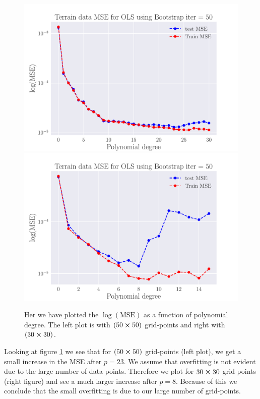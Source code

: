 \documentclass[reprint,english,notitlepage,aps,nobalancelastpage,nofootinbib]{revtex4-1}  %
\begin{document}
\begin{figure}[H]
  \includegraphics[width=\linewidth]{SRTM_MSE_OLS_n50_pol30_Bootstrap_re50_log.pdf}
  \endminipage\hfill
  \includegraphics[width=\linewidth]{SRTM_MSE_OLS_n30_pol15_Bootstrap_re50_log.pdf}
  \endminipage
  \caption{Her we have plotted the $\log(\text{MSE})$ as a function of polynomial degree. The left plot is with $(50\cross50)$ grid-points and right with $(30\cross30)$.}
  \label{fig:terrain_OLS_MSE_bootstrap}
\end{figure}

Looking at figure \ref{fig:terrain_OLS_MSE_bootstrap} we see that for $(50\cross50)$ grid-points (left plot), we get a small increase in the MSE after $p = 23$. We assume that overfitting is not evident due to the large number of data points. Therefore we plot for $30\cross30$ grid-points (right figure) and see a much larger increase after $p = 8$. Because of this we conclude that the small overfitting is due to our large number of grid-points.
\end{document}
